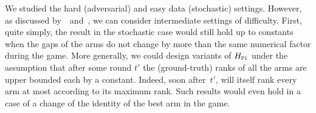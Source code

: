 %
\begin{remark}
	We studied the hard (adversarial) and easy data (stochastic) settings. 
	However, as discussed by~\cite{Seldin14OP}~and~\cite{Allesiardo17NS}, we can consider intermediate settings of difficulty.
	First, quite simply, the result in the stochastic case would still hold up
	to constants when the gaps of the arms do not change by more than the 
	same numerical factor during the game.
	More generally, we could design variants of $\complexityProOne$ under 
	the assumption that after some round $t'$ the (ground-truth) ranks of all the 
	arms are upper bounded each by a constant. %
	Indeed, soon after~$t'$, \Pone{} will itself rank every arm at most according to its 
	maximum rank.  Such results would even hold in 
	a case of a change of the identity of the best arm in the game.
\end{remark}%